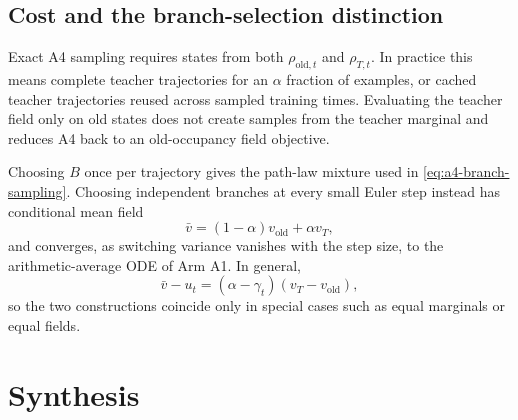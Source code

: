 \documentclass[11pt,a4paper]{article}
\newcommand{\vold}{v_{\mathrm{old}}}
\newcommand{\vT}{v_T}
\theoremstyle{plain}
\theoremstyle{definition}
\begin{document}
\subsection{Cost and the branch-selection distinction}

Exact A4 sampling requires states from both $\rho_{\mathrm{old},t}$ and $\rho_{T,t}$.  In
practice this means complete teacher trajectories for an $\alpha$ fraction of examples, or cached
teacher trajectories reused across sampled training times.  Evaluating the teacher field only on
old states does not create samples from the teacher marginal and reduces A4 back to an
old-occupancy field objective.

Choosing $B$ once per trajectory gives the path-law mixture used in
\eqref{eq:a4-branch-sampling}.  Choosing independent branches at every small Euler step instead
has conditional mean field
\begin{equation}
\bar v=(1-\alpha)\vold+\alpha\vT,
\label{eq:a4-rapid-switch}
\end{equation}
and converges, as switching variance vanishes with the step size, to the arithmetic-average ODE
of Arm A1.  In general,
\begin{equation}
\bar v-u_t
=(\alpha-\gamma_t)(\vT-\vold),
\label{eq:a4-average-gap}
\end{equation}
so the two constructions coincide only in special cases such as equal marginals or equal fields.

\section*{Synthesis}
\end{document}

